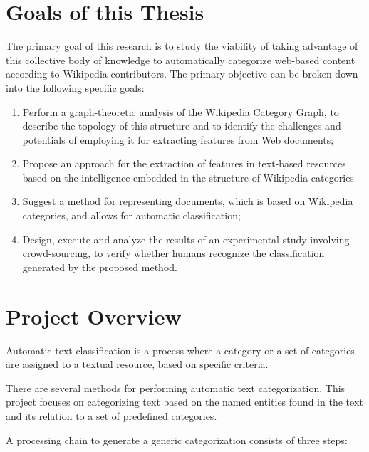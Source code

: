 \section{\hspace*{3pt}Goals of this Thesis}

The primary goal of this research is to study the viability of taking advantage of this collective body of knowledge to automatically categorize web-based content according to Wikipedia contributors. The primary objective can be broken down into the following specific goals:


\begin{enumerate}[i]

\item Perform a graph-theoretic analysis of the Wikipedia Category Graph, to describe the topology of this structure and to identify the challenges and potentials of employing it for extracting features from Web documents;

\item  Propose an approach for the  extraction of features in text-based resources based on the intelligence embedded in the structure of Wikipedia categories



\item Suggest a method for representing documents, which is based on Wikipedia categories, and allows for automatic classification;

\item Design, execute and analyze the results of an experimental study involving crowd-sourcing, to verify whether humans recognize the classification 
generated by the proposed method.


\end{enumerate}

\section{\hspace*{3pt} Project Overview}

Automatic text classification is a process where a category or a set of categories are assigned to a textual resource, based on specific criteria.

There are several methods for performing automatic text categorization. This project focuses on categorizing text based on the named entities found in the text and its relation to a set of predefined categories.

A processing chain to generate a generic categorization consists of three steps:

